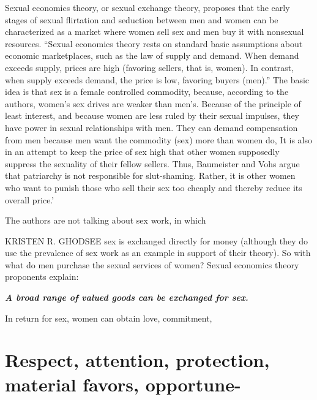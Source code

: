 Sexual economics theory, or sexual exchange theory, proposes that the early stages of sexual flirtation and seduction between men and women can be characterized as a market where women sell sex and men buy it with nonsexual resources. “Sexual economics theory rests on standard basic assumptions about economic marketplaces, such as the law of supply and demand. When demand exceeds supply, prices are high (favoring sellers, that is, women). In contrast, when supply exceeds demand, the price is low, favoring buyers (men).” The basic idea is that sex is a female controlled commodity, because, according to the authors, women’s sex drives are weaker than men’s. Because of the principle of least interest, and because women are less ruled by their sexual impulses, they have power in sexual relationships with men. They can demand compensation from men because men want the commodity (sex) more than women do, It is also in an attempt to keep the price of sex high that other women supposedly suppress the sexuality of their fellow sellers. Thus, Baumeister and Vohs argue that patriarchy is not responsible for slut-shaming. Rather, it is other women who want to punish those who sell their sex too cheaply and thereby reduce its overall price.’
 \par 
The authors are not talking about sex work, in which
 \par 
KRISTEN R. GHODSEE sex is exchanged directly for money (although they do use the prevalence of sex work as an example in support of their theory). So with what do men purchase the sexual services of women? Sexual economics theory proponents explain:
 \par 
\textit\textbf{ {A broad range of valued goods can be exchanged for sex.} }
 \par 
In return for sex, women can obtain love, commitment,
 \par 
\chapter{Respect, attention, protection, material favors, opportune-}\label{Respect, attention, protection, material favors, opportune-}
 \par 
